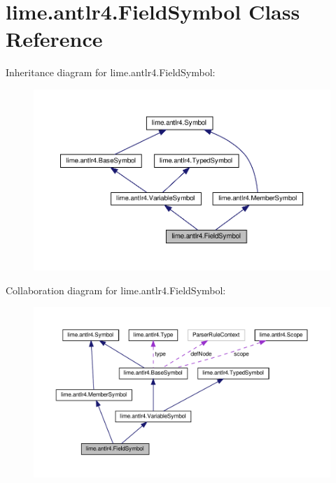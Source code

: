 \hypertarget{classlime_1_1antlr4_1_1FieldSymbol}{}\section{lime.\+antlr4.\+Field\+Symbol Class Reference}
\label{classlime_1_1antlr4_1_1FieldSymbol}


Inheritance diagram for lime.\+antlr4.\+Field\+Symbol\+:
\nopagebreak
\begin{figure}[H]
\begin{center}
\leavevmode
\includegraphics[width=350pt]{classlime_1_1antlr4_1_1FieldSymbol__inherit__graph}
\end{center}
\end{figure}


Collaboration diagram for lime.\+antlr4.\+Field\+Symbol\+:
\nopagebreak
\begin{figure}[H]
\begin{center}
\leavevmode
\includegraphics[width=350pt]{classlime_1_1antlr4_1_1FieldSymbol__coll__graph}
\end{center}
\end{figure}
